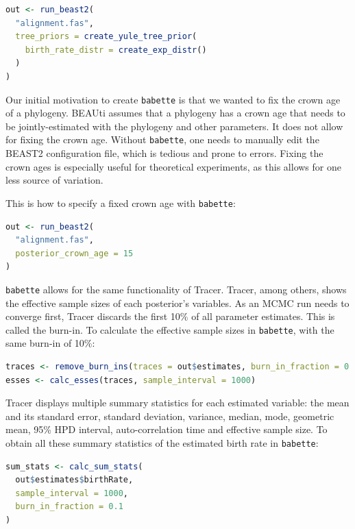 \documentclass{article}
\begin{document}
\begin{lstlisting}[language=R, caption=Example with Yule tree prior with different birth rate distribution, label=lst:diff_distr, floatplacement=H]
out <- run_beast2(
  "alignment.fas",
  tree_priors = create_yule_tree_prior(
    birth_rate_distr = create_exp_distr()    
  )
)
\end{lstlisting}

Our initial motivation to create \verb;babette; 
is that we wanted to fix the crown age of a phylogeny.
BEAUti assumes that a phylogeny has a crown age that needs to be jointly-estimated
with the phylogeny and other parameters. It does not allow for fixing
the crown age. Without \verb;babette;, one needs to manually edit the BEAST2 
configuration file, which is tedious and prone to errors. 
Fixing the crown ages is especially useful for theoretical experiments,
as this allows for one less source of variation.

This is how to specify a fixed crown age with \verb;babette;:

\begin{lstlisting}[language=R, caption=Example with fixed crown age, label=lst:fixed_crown_age, floatplacement=H]
out <- run_beast2(
  "alignment.fas",
  posterior_crown_age = 15
)
\end{lstlisting}

\verb;babette; allows for the same functionality of Tracer. 
Tracer, among others, shows the effective sample
sizes of each posterior's variables. As an MCMC run needs to
converge first, Tracer discards the first 10\% of all parameter
estimates. This is called the burn-in. To calculate the effective
sample sizes in \verb;babette;, with the same burn-in of 10\%:

\begin{lstlisting}[language=R, caption=Calculate ESSes, label=lst:calc_esses, floatplacement=H]
traces <- remove_burn_ins(traces = out$estimates, burn_in_fraction = 0.1)
esses <- calc_esses(traces, sample_interval = 1000)
\end{lstlisting}

Tracer displays multiple summary statistics for each
estimated variable: the mean and its standard error, standard deviation,
variance, median, mode, geometric mean, 95\% HPD interval, auto-correlation
time and effective sample size. To obtain all these summary statistics 
of the estimated birth rate in \verb;babette;:

\begin{lstlisting}[language=R, caption=Calculate all summary statistics, label=lst:calc_sum_stats, floatplacement=H]
sum_stats <- calc_sum_stats(
  out$estimates$birthRate, 
  sample_interval = 1000, 
  burn_in_fraction = 0.1
)
\end{lstlisting}
\end{document}
